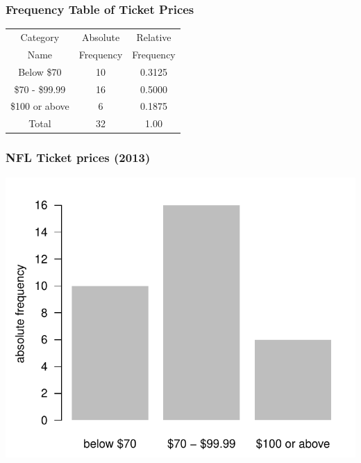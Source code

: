 \documentclass[12pt]{beamer}\usepackage[]{graphicx}\usepackage[]{color}
\newenvironment{knitrout}{}{} %
\begin{document}

\begin{frame}
\frametitle{Frequency Table of Ticket Prices}

{\large
\begin{center}
 \begin{tabular}{c c c}
  \hline
  Category & Absolute & Relative \\
  Name & Frequency & Frequency \\
  \hline
  Below \$70 & 10 & 0.3125 \\
  \$70 - \$99.99 & 16 & 0.5000 \\
  \$100 or above & 6 & 0.1875 \\
  \hline
  Total & 32 & 1.00 \\
 \end{tabular}
\end{center}
}

\end{frame}


\begin{frame}[fragile]
\frametitle{NFL Ticket prices (2013)}
\begin{knitrout}\footnotesize
{}\color{fgcolor}

{\centering \includegraphics[width=.7\linewidth,height=.6\linewidth]{figure/unnamed-chunk-17-1} 

}



\end{knitrout}

\end{frame}
\end{document}
